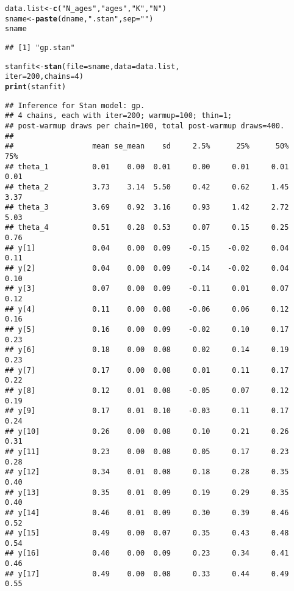 \documentclass{article}\usepackage[]{graphicx}\usepackage[]{color}
\makeatletter
\newcommand{\hlnum}[1]{\textcolor[rgb]{0.686,0.059,0.569}{#1}}%
\newcommand{\hlstr}[1]{\textcolor[rgb]{0.192,0.494,0.8}{#1}}%
\newcommand{\hlstd}[1]{\textcolor[rgb]{0.345,0.345,0.345}{#1}}%
\newcommand{\hlkwb}[1]{\textcolor[rgb]{0.69,0.353,0.396}{#1}}%
\newcommand{\hlkwc}[1]{\textcolor[rgb]{0.333,0.667,0.333}{#1}}%
\newcommand{\hlkwd}[1]{\textcolor[rgb]{0.737,0.353,0.396}{\textbf{#1}}}%
\newenvironment{kframe}{%
 \def\at@end@of@kframe{}%
 \ifinner\ifhmode%
  \def\at@end@of@kframe{\end{minipage}}%
  \begin{minipage}{\columnwidth}%
 \fi\fi%
 \def\FrameCommand##1{\hskip\@totalleftmargin \hskip-\fboxsep
 \colorbox{shadecolor}{##1}\hskip-\fboxsep
     \hskip-\linewidth \hskip-\@totalleftmargin \hskip\columnwidth}%
 \MakeFramed {\advance\hsize-\width
   \@totalleftmargin\z@ \linewidth\hsize
   \@setminipage}}%
 {\par\unskip\endMakeFramed%
 \at@end@of@kframe}
\newenvironment{knitrout}{}{} %
\makeatother
\begin{document}
\begin{knitrout}
\begin{kframe}
\begin{alltt}
\hlstd{data.list} \hlkwb{<-} \hlkwd{c}\hlstd{(}\hlstr{"N_ages"}\hlstd{,}\hlstr{"ages"}\hlstd{,}\hlstr{"K"}\hlstd{,}\hlstr{"N"}\hlstd{)}
\hlstd{sname}\hlkwb{<-}\hlkwd{paste}\hlstd{(dname,}\hlstr{".stan"}\hlstd{,}\hlkwc{sep}\hlstd{=}\hlstr{""}\hlstd{)}
\hlstd{sname}
\end{alltt}
\begin{verbatim}
## [1] "gp.stan"
\end{verbatim}
\begin{alltt}
\hlstd{stanfit} \hlkwb{<-} \hlkwd{stan}\hlstd{(}\hlkwc{file}\hlstd{=sname,} \hlkwc{data}\hlstd{=data.list,}
                      \hlkwc{iter}\hlstd{=}\hlnum{200}\hlstd{,} \hlkwc{chains}\hlstd{=}\hlnum{4}\hlstd{)}
\hlkwd{print}\hlstd{(stanfit)}
\end{alltt}
\begin{verbatim}
## Inference for Stan model: gp.
## 4 chains, each with iter=200; warmup=100; thin=1; 
## post-warmup draws per chain=100, total post-warmup draws=400.
## 
##                  mean se_mean    sd     2.5%      25%      50%      75%
## theta_1          0.01    0.00  0.01     0.00     0.01     0.01     0.01
## theta_2          3.73    3.14  5.50     0.42     0.62     1.45     3.37
## theta_3          3.69    0.92  3.16     0.93     1.42     2.72     5.03
## theta_4          0.51    0.28  0.53     0.07     0.15     0.25     0.76
## y[1]             0.04    0.00  0.09    -0.15    -0.02     0.04     0.11
## y[2]             0.04    0.00  0.09    -0.14    -0.02     0.04     0.10
## y[3]             0.07    0.00  0.09    -0.11     0.01     0.07     0.12
## y[4]             0.11    0.00  0.08    -0.06     0.06     0.12     0.16
## y[5]             0.16    0.00  0.09    -0.02     0.10     0.17     0.23
## y[6]             0.18    0.00  0.08     0.02     0.14     0.19     0.23
## y[7]             0.17    0.00  0.08     0.01     0.11     0.17     0.22
## y[8]             0.12    0.01  0.08    -0.05     0.07     0.12     0.19
## y[9]             0.17    0.01  0.10    -0.03     0.11     0.17     0.24
## y[10]            0.26    0.00  0.08     0.10     0.21     0.26     0.31
## y[11]            0.23    0.00  0.08     0.05     0.17     0.23     0.28
## y[12]            0.34    0.01  0.08     0.18     0.28     0.35     0.40
## y[13]            0.35    0.01  0.09     0.19     0.29     0.35     0.40
## y[14]            0.46    0.01  0.09     0.30     0.39     0.46     0.52
## y[15]            0.49    0.00  0.07     0.35     0.43     0.48     0.54
## y[16]            0.40    0.00  0.09     0.23     0.34     0.41     0.46
## y[17]            0.49    0.00  0.08     0.33     0.44     0.49     0.55

\end{verbatim}
\end{kframe}
\end{knitrout}
\end{document}
